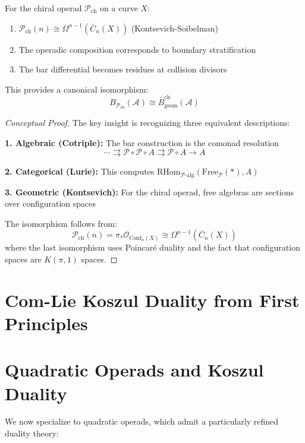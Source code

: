 \begin{theorem}\label{thm:geometric-bridge}
For the chiral operad $\mathcal{P}_{\text{ch}}$ on a curve $X$:
\begin{enumerate}
\item $\mathcal{P}_{\text{ch}}(n) \cong \Omega^{n-1}(\overline{C}_n(X))$ (Kontsevich-Soibelman)
\item The operadic composition corresponds to boundary stratification
\item The bar differential becomes residues at collision divisors
\end{enumerate}

This provides a canonical isomorphism:
$$B_{\mathcal{P}_{\text{ch}}}(\mathcal{A}) \cong \bar{B}^{\text{ch}}_{\text{geom}}(\mathcal{A})$$
\end{theorem}

\begin{proof}[Conceptual Proof]
The key insight is recognizing three equivalent descriptions:

\textbf{1. Algebraic (Cotriple):} The bar construction is the comonad resolution
$$\cdots \rightrightarrows \mathcal{P} \circ \mathcal{P} \circ A \rightrightarrows \mathcal{P} \circ A \to A$$

\textbf{2. Categorical (Lurie):} This computes $\text{RHom}_{\mathcal{P}\text{-alg}}(\text{Free}_{\mathcal{P}}(\ast), A)$

\textbf{3. Geometric (Kontsevich):} For the chiral operad, free algebras are sections over configuration spaces

The isomorphism follows from:
$$\mathcal{P}_{\text{ch}}(n) = \pi_*\mathcal{O}_{\text{Conf}_n(X)} \cong \Omega^{n-1}(\overline{C}_n(X))$$
where the last isomorphism uses Poincaré duality and the fact that configuration spaces are $K(\pi,1)$ spaces.
\end{proof}

\section{Com-Lie Koszul Duality from First Principles}
 
\section{Quadratic Operads and Koszul Duality}
 
We now specialize to quadratic operads, which admit a particularly refined duality theory:
 
